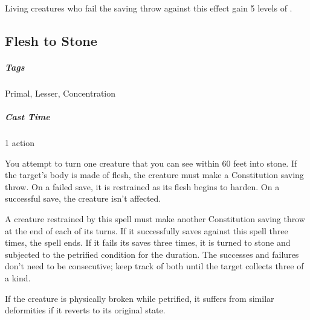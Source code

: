 Living creatures who fail the saving throw against this effect gain 5 levels of .









\subsection{Flesh to Stone}
\subparagraph*{Tags} Primal, Lesser, Concentration
\subparagraph*{Cast Time} 1 action

You attempt to turn one creature that you can see within 60 feet into stone. If the target’s body is made of flesh, the creature must make a Constitution saving throw. On a failed save, it is restrained as its flesh begins to harden. On a successful save, the creature isn’t affected.

A creature restrained by this spell must make another Constitution saving throw at the end of each of its turns. If it successfully saves against this spell three times, the spell ends. If it fails its saves three times, it is turned to stone and subjected to the petrified condition for the duration. The successes and failures don’t need to be consecutive; keep track of both until the target collects three of a kind.

If the creature is physically broken while petrified, it suffers from similar deformities if it reverts to its original state.

